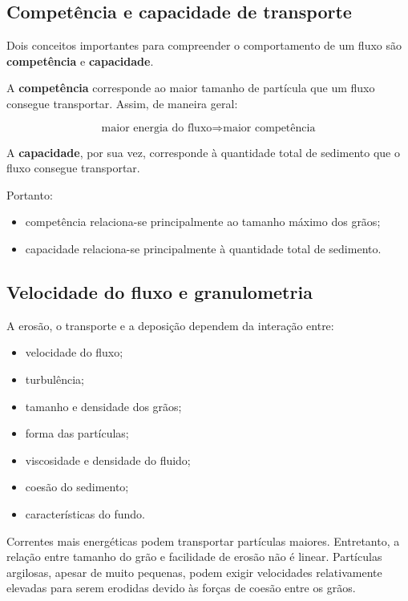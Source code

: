 \documentclass[a4paper,12pt]{article}
\theoremstyle{definition}
\theoremstyle{definition}
\theoremstyle{definition}
\begin{document}
\subsection{Competência e capacidade de transporte}

Dois conceitos importantes para compreender o comportamento de um fluxo são
\textbf{competência} e \textbf{capacidade}.

A \textbf{competência} corresponde ao maior tamanho de partícula que um fluxo
consegue transportar. Assim, de maneira geral:

\[
\text{maior energia do fluxo}
\Rightarrow
\text{maior competência}
\]

A \textbf{capacidade}, por sua vez, corresponde à quantidade total de sedimento
que o fluxo consegue transportar.

Portanto:

\begin{itemize}
    \item competência relaciona-se principalmente ao tamanho máximo dos grãos;
    \item capacidade relaciona-se principalmente à quantidade total de sedimento.
\end{itemize}

\subsection{Velocidade do fluxo e granulometria}

A erosão, o transporte e a deposição dependem da interação entre:

\begin{itemize}
    \item velocidade do fluxo;
    \item turbulência;
    \item tamanho e densidade dos grãos;
    \item forma das partículas;
    \item viscosidade e densidade do fluido;
    \item coesão do sedimento;
    \item características do fundo.
\end{itemize}

Correntes mais energéticas podem transportar partículas maiores. Entretanto, a
relação entre tamanho do grão e facilidade de erosão não é linear. Partículas
argilosas, apesar de muito pequenas, podem exigir velocidades relativamente
elevadas para serem erodidas devido às forças de coesão entre os grãos.
\end{document}
